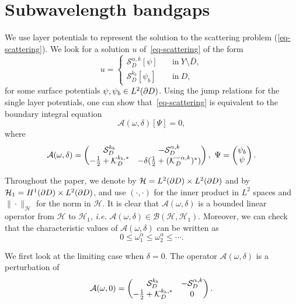 \documentclass[11pt]{article}
\numberwithin{equation}{section}
\def\cH{{\mathcal{H}}}
\newcommand\1{{\ensuremath {\mathds 1} }}
\def\be{\begin{equation}} \def\ee{\end{equation}}
\begin{document}
\section{Subwavelength bandgaps} \label{sec-2}

We use layer potentials to represent the solution to the scattering problem (\ref{eq-scattering}).
We look for a solution $u$ of~\eqref{eq-scattering} of the form
\be \label{Helm-solution}
u =
\begin{cases}
\mathcal{S}_{D}^{\alpha,k} [\psi]\quad & \text{in} ~ Y \setminus \bar{D},\\
 \mathcal{S}_{D}^{k_b} [\psi_b]   &\text{in} ~   {D},
\end{cases}
\ee
for some surface potentials $\psi, \psi_b \in  L^2(\partial D)$. 
Using the jump relations for the single layer potentials, one can show that~\eqref{eq-scattering} is equivalent to the boundary integral equation
\be  \label{eq-boundary}
\mathcal{A}(\omega, \delta)[\Psi] =0,  
\ee
where
\[
\mathcal{A}(\omega, \delta) = 
 \begin{pmatrix}
  \mathcal{S}_D^{k_b} &  -\mathcal{S}_D^{\alpha,k}  \\
  -\frac{1}{2}+ \mathcal{K}_D^{k_b, *}& -\delta( \frac{1}{2}+ (\mathcal{K}_D^{ -\alpha,k})^*)
\end{pmatrix}, 
\,\, \Psi= 
\begin{pmatrix}
\psi_b\\
\psi
\end{pmatrix}.
\]

Throughout the paper, we denote by $\mathcal{H} = L^2(\partial D) \times L^2(\partial D)$ and by $\mathcal{H}_1 = H^1(\partial D) \times L^2(\partial D)$, 
and use $(\cdot, \cdot)$ for the inner product in $L^2$ spaces and $\| \cdot \|_\cH$ for the norm in $\mathcal{H}$.  It is clear that $\mathcal{A}(\omega, \delta)$ is a bounded linear operator from $\mathcal{H}$ to $\mathcal{H}_1$, \textit{i.e.}
$\mathcal{A}(\omega, \delta) \in \mathcal{B}(\mathcal{H}, \mathcal{H}_1)$. Moreover, we can check that the characteristic values of $\mathcal{A}(\omega,\delta)$ can be written as
$$  0 \le \omega_1^\alpha \le \omega_2^\alpha \le \cdots. $$

 We first look at the limiting case when $\delta =0$. The operator $\mathcal{A}(\omega, \delta)$ is a perturbation of
\be  \label{eq-A_0-3d}
 \mathcal{A}(\omega, 0) = 
 \begin{pmatrix}
  \mathcal{S}_D^{k_b} &  -\mathcal{S}_D^{\alpha,k}  \\
  -\f{1}{2}+ \mathcal{K}_D^{k_b,*}& 0
\end{pmatrix}.
\ee 
\end{document}
